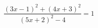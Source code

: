 \begin{ex}[type=equation]
	\begin{condition}
		$\dfrac{(3x-1)^2 + (4x + 3)^2}{(5x + 2)^2 - 4} = 1$
	\end{condition}
\end{ex}